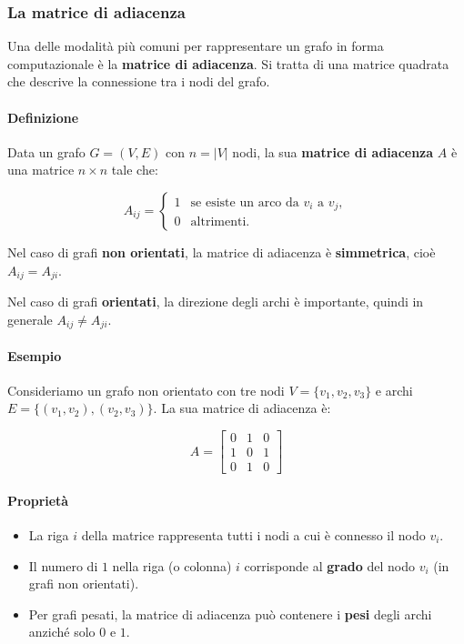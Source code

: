 \subsubsection*{La matrice di adiacenza}

Una delle modalità più comuni per rappresentare un grafo in forma computazionale è la \textbf{matrice di adiacenza}. Si tratta di una matrice quadrata che descrive la connessione tra i nodi del grafo.

\paragraph{Definizione}

Data un grafo $G = (V, E)$ con $n = |V|$ nodi, la sua \textbf{matrice di adiacenza} $A$ è una matrice $n \times n$ tale che:

\[
A_{ij} =
\begin{cases}
1 & \text{se esiste un arco da } v_i \text{ a } v_j, \\
0 & \text{altrimenti.}
\end{cases}
\]

Nel caso di grafi \textbf{non orientati}, la matrice di adiacenza è \textbf{simmetrica}, cioè $A_{ij} = A_{ji}$.

Nel caso di grafi \textbf{orientati}, la direzione degli archi è importante, quindi in generale $A_{ij} \neq A_{ji}$.

\paragraph{Esempio}

Consideriamo un grafo non orientato con tre nodi $V = \{v_1, v_2, v_3\}$ e archi $E = \{(v_1, v_2), (v_2, v_3)\}$. La sua matrice di adiacenza è:

\[
A =
\begin{bmatrix}
0 & 1 & 0 \\
1 & 0 & 1 \\
0 & 1 & 0
\end{bmatrix}
\]

\paragraph{Proprietà}

\begin{itemize}
    \item La riga $i$ della matrice rappresenta tutti i nodi a cui è connesso il nodo $v_i$.
    \item Il numero di $1$ nella riga (o colonna) $i$ corrisponde al \textbf{grado} del nodo $v_i$ (in grafi non orientati).
    \item Per grafi pesati, la matrice di adiacenza può contenere i \textbf{pesi} degli archi anziché solo $0$ e $1$.
\end{itemize}

